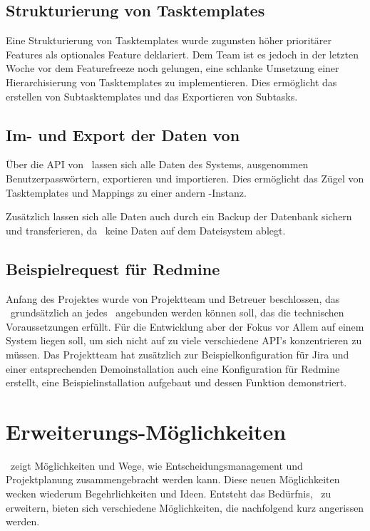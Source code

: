 	
		\subsection{Strukturierung von Tasktemplates}
			Eine Strukturierung von Tasktemplates wurde zugunsten höher prioritärer Features als optionales Feature deklariert.
			Dem Team ist es jedoch in der letzten Woche vor dem Featurefreeze noch gelungen, eine schlanke Umsetzung einer Hierarchisierung von Tasktemplates zu implementieren.
			Dies ermöglicht das erstellen von Subtasktemplates und das Exportieren von Subtasks.
			
		
		\subsection{Im- und Export der Daten von \eeppi}
			Über die API von \eeppi\ lassen sich alle Daten des Systems,
			ausgenommen Benutzerpasswörtern, exportieren und importieren.
			Dies ermöglicht das Zügel von Tasktemplates und Mappings zu einer andern \eeppi -Instanz.
			
			Zusätzlich lassen sich alle Daten auch durch ein Backup der Datenbank sichern und transferieren, da \eeppi\ keine Daten auf dem Dateisystem ablegt.
			
			
		\subsection{Beispielrequest für Redmine}
			Anfang des Projektes wurde von Projektteam und Betreuer beschlossen, 
			das \eeppi\ grundsätzlich an jedes \ppt\ angebunden werden können soll, das die technischen Voraussetzungen erfüllt.
			Für die Entwicklung aber der Fokus vor Allem auf einem System liegen soll, um sich nicht auf zu viele verschiedene API's konzentrieren zu müssen.
			Das Projektteam hat zusätzlich zur Beispielkonfiguration für Jira und einer entsprechenden Demoinstallation auch eine Konfiguration für Redmine erstellt, eine Beispielinstallation aufgebaut und dessen Funktion demonstriert.
	
	
	\section{Erweiterungs-Möglichkeiten}
		\eeppi\ zeigt Möglichkeiten und Wege, wie Entscheidungsmanagement und Projektplanung zusammengebracht werden kann.
		Diese neuen Möglichkeiten wecken wiederum Begehrlichkeiten und Ideen.
		Entsteht das Bedürfnis, \eeppi\ zu erweitern, bieten sich verschiedene Möglichkeiten, die nachfolgend kurz angerissen werden.
		

